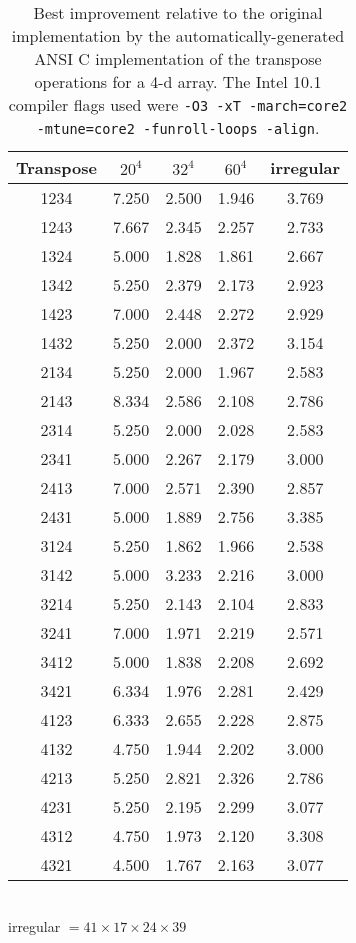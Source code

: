 \documentclass[aps,preprint,groupedaddress]{revtex4-1}
\begin{document}
\begin{table}[!hp]
\caption{Best improvement relative to the original implementation by the automatically-generated ANSI C implementation of the transpose operations for a 4-d array.  The Intel 10.1 compiler flags used were \texttt{-O3 -xT -march=core2 -mtune=core2 -funroll-loops -align}.} \label{tab:spaghetty1}
\begin{tabular}{ccccc}
\hline\hline
Transpose & $20^4$ & $32^4$ & $60^4$ & irregular \\
\hline
1234 & 7.250 & 2.500 & 1.946 & 3.769 \\
1243 & 7.667 & 2.345 & 2.257 & 2.733 \\
1324 & 5.000 & 1.828 & 1.861 & 2.667 \\
1342 & 5.250 & 2.379 & 2.173 & 2.923 \\
1423 & 7.000 & 2.448 & 2.272 & 2.929 \\
1432 & 5.250 & 2.000 & 2.372 & 3.154 \\
2134 & 5.250 & 2.000 & 1.967 & 2.583 \\
2143 & 8.334 & 2.586 & 2.108 & 2.786 \\
2314 & 5.250 & 2.000 & 2.028 & 2.583 \\
2341 & 5.000 & 2.267 & 2.179 & 3.000 \\
2413 & 7.000 & 2.571 & 2.390 & 2.857 \\
2431 & 5.000 & 1.889 & 2.756 & 3.385 \\
3124 & 5.250 & 1.862 & 1.966 & 2.538 \\
3142 & 5.000 & 3.233 & 2.216 & 3.000 \\
3214 & 5.250 & 2.143 & 2.104 & 2.833 \\
3241 & 7.000 & 1.971 & 2.219 & 2.571 \\
3412 & 5.000 & 1.838 & 2.208 & 2.692 \\
3421 & 6.334 & 1.976 & 2.281 & 2.429 \\
4123 & 6.333 & 2.655 & 2.228 & 2.875 \\
4132 & 4.750 & 1.944 & 2.202 & 3.000 \\
4213 & 5.250 & 2.821 & 2.326 & 2.786 \\
4231 & 5.250 & 2.195 & 2.299 & 3.077 \\
4312 & 4.750 & 1.973 & 2.120 & 3.308 \\
4321 & 4.500 & 1.767 & 2.163 & 3.077 \\
\hline\hline
\end{tabular}\\
irregular $= 41\times17\times24\times39$
\end{table}
\end{document}
